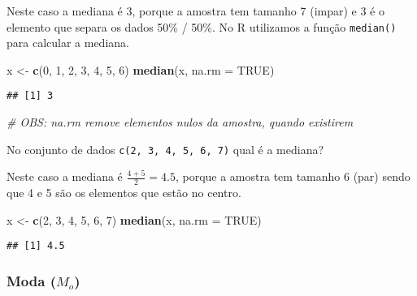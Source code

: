 \documentclass[11pt,]{style/krantz}
\makeatletter
\newenvironment{Shaded}{\begin{snugshade}}{\end{snugshade}}
\newcommand{\CommentTok}[1]{\textcolor[rgb]{0.56,0.35,0.01}{\textit{#1}}}
\newcommand{\DataTypeTok}[1]{\textcolor[rgb]{0.13,0.29,0.53}{#1}}
\newcommand{\DecValTok}[1]{\textcolor[rgb]{0.00,0.00,0.81}{#1}}
\newcommand{\KeywordTok}[1]{\textcolor[rgb]{0.13,0.29,0.53}{\textbf{#1}}}
\newcommand{\NormalTok}[1]{#1}
\newcommand{\OtherTok}[1]{\textcolor[rgb]{0.56,0.35,0.01}{#1}}
\newcommand{\StringTok}[1]{\textcolor[rgb]{0.31,0.60,0.02}{#1}}
\newenvironment{kframe}{%
\medskip{}
\setlength{\fboxsep}{.8em}
 \def\at@end@of@kframe{}%
 \ifinner\ifhmode%
  \def\at@end@of@kframe{\end{minipage}}%
  \begin{minipage}{\columnwidth}%
 \fi\fi%
 \def\FrameCommand##1{\hskip\@totalleftmargin \hskip-\fboxsep
 \colorbox{shadecolor}{##1}\hskip-\fboxsep
     \hskip-\linewidth \hskip-\@totalleftmargin \hskip\columnwidth}%
 \MakeFramed {\advance\hsize-\width
   \@totalleftmargin\z@ \linewidth\hsize
   \@setminipage}}%
 {\par\unskip\endMakeFramed%
 \at@end@of@kframe}
\renewenvironment{Shaded}{\begin{kframe}}{\end{kframe}}
\theoremstyle{definition}
\theoremstyle{definition}
\theoremstyle{definition}
\theoremstyle{remark}
\let\BeginKnitrBlock\begin \let\EndKnitrBlock\end
\makeatother
\begin{document}
Neste caso a mediana é 3, porque a amostra tem tamanho 7 (impar) e 3 é o elemento que separa os dados 50\% / 50\%. No R utilizamos a função \texttt{median()} para calcular a mediana.

\begin{Shaded}
\begin{Highlighting}[]
\NormalTok{x <-}\StringTok{ }\KeywordTok{c}\NormalTok{(}\DecValTok{0}\NormalTok{, }\DecValTok{1}\NormalTok{, }\DecValTok{2}\NormalTok{, }\DecValTok{3}\NormalTok{, }\DecValTok{4}\NormalTok{, }\DecValTok{5}\NormalTok{, }\DecValTok{6}\NormalTok{)}
\KeywordTok{median}\NormalTok{(x, }\DataTypeTok{na.rm =} \OtherTok{TRUE}\NormalTok{)}
\end{Highlighting}
\end{Shaded}

\begin{verbatim}
## [1] 3
\end{verbatim}

\begin{Shaded}
\begin{Highlighting}[]
\CommentTok{# OBS: na.rm remove elementos nulos da amostra, quando existirem}
\end{Highlighting}
\end{Shaded}

\BeginKnitrBlock{example}
\protect\hypertarget{exm:unnamed-chunk-52}{}{\label{exm:unnamed-chunk-52} }No conjunto de dados \texttt{c(2,\ 3,\ 4,\ 5,\ 6,\ 7)} qual é a mediana?
\EndKnitrBlock{example}

Neste caso a mediana é \(\frac{4 + 5}{2} = 4.5\), porque a amostra tem tamanho 6 (par) sendo que 4 e 5 são os elementos que estão no centro.

\begin{Shaded}
\begin{Highlighting}[]
\NormalTok{x <-}\StringTok{ }\KeywordTok{c}\NormalTok{(}\DecValTok{2}\NormalTok{, }\DecValTok{3}\NormalTok{, }\DecValTok{4}\NormalTok{, }\DecValTok{5}\NormalTok{, }\DecValTok{6}\NormalTok{, }\DecValTok{7}\NormalTok{)}
\KeywordTok{median}\NormalTok{(x, }\DataTypeTok{na.rm =} \OtherTok{TRUE}\NormalTok{)}
\end{Highlighting}
\end{Shaded}

\begin{verbatim}
## [1] 4.5
\end{verbatim}

\hypertarget{moda-m_o}{%
\subsubsection{\texorpdfstring{Moda (\(M_o\))}{Moda (M\_o)}}\label{moda-m_o}}
\end{document}
